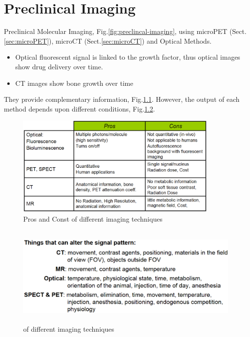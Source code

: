 \chapter{Preclinical Imaging}


Preclinical Molecular Imaging, Fig.\ref{fig:preclincal-imaging}, using microPET
(Sect.\ref{sec:microPET}), microCT (Sect.\ref{sec:microCT}) and Optical Methods.
\begin{itemize}
  
  \item  Optical fluorescent signal is linked to the growth factor, thus optical
  images show drug delivery over time.

  \item CT images show bone growth over time 
\end{itemize}
They provide complementary information,
Fig.\ref{fig:preclincal-imaging-pros-cons}. However, the output of each method
depends upon different conditions, Fig.\ref{fig:preclincal-imaging-depend}.

\begin{figure}[hbt]
  \centerline{\includegraphics[height=5cm,
    angle=0]{./images/preclincal-imaging-pros-cons.eps}}
\caption{Pros and Const of different imaging techniques}
\label{fig:preclincal-imaging-pros-cons}
\end{figure}

\begin{figure}[hbt]
  \centerline{\includegraphics[height=5cm,
    angle=0]{./images/preclincal-imaging-depend.eps}}
\caption{of different imaging techniques}
\label{fig:preclincal-imaging-depend}
\end{figure}



